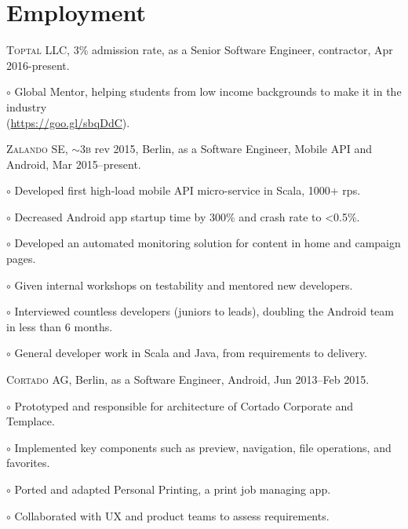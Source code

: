 \documentclass[letterpaper]{article}
\renewenvironment{itemize}{
  \begin{list}{}{
    \setlength{\leftmargin}{1.5em}
  }
}{
  \end{list}
}
\newenvironment{no-indent-itemize}{
  \begin{list}{}{
    \setlength{\leftmargin}{0em}
  }
}{
  \end{list}
}
\def\tilde{$\scriptstyle\sim$}
\def\bullet{$\circ$\xspace}
\begin{document}
\section*{Employment}
\begin{no-indent-itemize}
  \item \textsc{Toptal LLC}, 3\% admission rate, as a Senior Software Engineer, contractor, Apr 2016-present.
  \begin{itemize}
    \item\bullet Global Mentor, helping students from low income backgrounds to make it in the industry \\  
    \phantom{\bullet }(\href{https://goo.gl/sbqDdC}{https://goo.gl/sbqDdC}).
  \end{itemize}
  \item \textsc{Zalando SE}, \tilde 3\textsc{b} rev 2015, Berlin, as a Software Engineer, 
         Mobile API and Android, Mar 2015--present. 
  \begin{itemize}
    \item\bullet Developed first high-load mobile API micro-service in Scala, 1000+ rps.
	\item\bullet Decreased Android app startup time by 300\% and crash rate to <0.5\%.
	\item\bullet Developed an automated monitoring solution for content in home and campaign pages.
	\item\bullet Given internal workshops on testability and mentored new developers.
	\item\bullet Interviewed countless developers (juniors to leads), doubling the Android team in less than 6 months.	
	\item\bullet General developer work in Scala and Java, from requirements to delivery.
  \end{itemize}
  \item \textsc{Cortado AG}, Berlin, as a Software Engineer, Android, Jun 2013--Feb 2015.
  \begin{itemize}
    \item\bullet Prototyped and responsible for architecture of Cortado Corporate and Templace.
    \item\bullet Implemented key components such as preview, navigation, file operations, and favorites.
    \item\bullet Ported and adapted Personal Printing, a print job managing app.
    \item\bullet Collaborated with UX and product teams to assess requirements.
  \end{itemize}

\end{no-indent-itemize}
\end{document}
